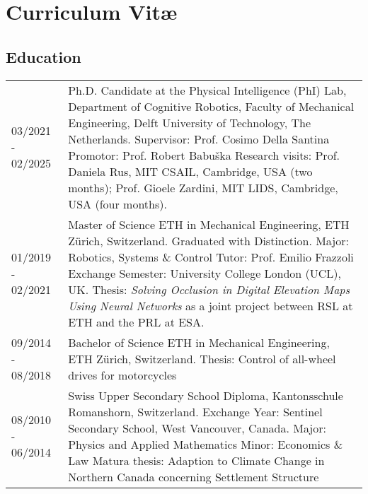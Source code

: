 \chapter*{Curriculum Vit\ae}

\makeatletter
\authors{\@firstname\ {\titleshape\@lastname}}
\makeatother

\noindent

\section*{Education}
\noindent
\begin{longtable}{p{} p{}}
    03/2021 - 02/2025 & Ph.D. Candidate at the Physical Intelligence (PhI) Lab, Department of Cognitive Robotics, Faculty of Mechanical Engineering, Delft University of Technology, The Netherlands. \newline 
    Supervisor: Prof. Cosimo Della Santina \newline 
    Promotor: Prof. Robert Babuška \newline 
    Research visits: Prof. Daniela Rus, MIT CSAIL, Cambridge, USA (two months); Prof. Gioele Zardini, MIT LIDS, Cambridge, USA (four months). \\
    01/2019 - 02/2021 & Master of Science ETH in Mechanical Engineering, ETH Zürich, Switzerland. Graduated with Distinction. \newline
    Major: Robotics, Systems \& Control
    Tutor: Prof. Emilio Frazzoli \newline
    Exchange Semester: University College London (UCL), UK. \newline
    Thesis: \emph{Solving Occlusion in Digital Elevation Maps Using Neural Networks} as a joint project between RSL at ETH and the PRL at ESA.\\
    09/2014 - 08/2018 & Bachelor of Science ETH in Mechanical Engineering, ETH Zürich, Switzerland. \newline Thesis: Control of all-wheel drives for motorcycles\\
    08/2010 - 06/2014 & Swiss Upper Secondary School Diploma, Kantonsschule Romanshorn, Switzerland. \newline
    Exchange Year: Sentinel Secondary School, West Vancouver, Canada. \newline
    Major: Physics and Applied Mathematics \newline
    Minor: Economics \& Law \newline
    Matura thesis: Adaption to Climate Change in Northern Canada concerning Settlement Structure \newline
\end{longtable}

